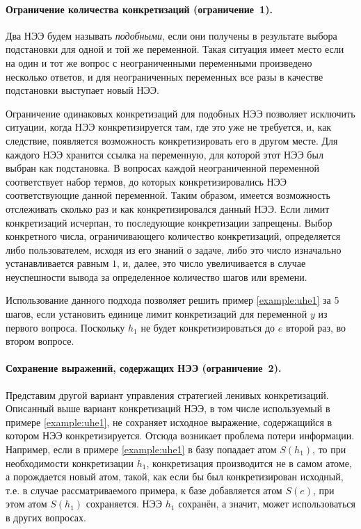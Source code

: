 \paragraph{Ограничение количества конкретизаций (ограничение~1).}
Два НЭЭ будем называть \emph{подобными}, если они получены в результате выбора подстановки для одной и той же переменной. Такая ситуация имеет место если на один и тот же вопрос с неограниченными переменными произведено несколько ответов, и для неограниченных переменных все разы в качестве подстановки выступает новый НЭЭ.

Ограничение одинаковых конкретизаций для подобных НЭЭ позволяет исключить ситуации, когда НЭЭ конкретизируется там, где это уже не требуется, и, как следствие, появляется возможность конкретизировать его в другом месте. Для каждого НЭЭ хранится ссылка на переменную, для которой этот НЭЭ был выбран как подстановка. В вопросах каждой неограниченной переменной соответствует набор термов, до которых конкретизировались НЭЭ соответствующие данной переменной. Таким образом, имеется возможность отслеживать сколько раз и как конкретизировался данный НЭЭ. Если лимит конкретизаций исчерпан, то последующие конкретизации запрещены. Выбор конкретного числа, ограничивающего количество конкретизаций, определяется либо пользователем, исходя из его знаний о задаче, либо это число изначально устанавливается равным $1$, и, далее, это число увеличивается в случае неуспешности вывода за определенное количество шагов или времени.

Использование данного подхода позволяет решить пример \ref{example:uhe1} за 5 шагов, если установить единице лимит конкретизаций для переменной $y$ из первого вопроса. Поскольку $h_1$ не будет конкретизироваться до $e$ второй раз, во втором вопросе.

\paragraph{Сохранение выражений, содержащих НЭЭ (ограничение~2).}
Представим другой вариант управления стратегией ленивых конкретизаций. Описанный выше вариант конкретизаций НЭЭ, в том числе используемый в примере \ref{example:uhe1}, не сохраняет исходное выражение, содержащийся в котором НЭЭ конкретизируется. Отсюда возникает проблема потери информации. Например, если в примере \ref{example:uhe1} в базу попадает атом $S(h_1)$, то при необходимости конкретизации $h_1$, конкретизация производится не в самом атоме, а порождается новый атом, такой, как если бы был конкретизирован исходный, т.е. в случае рассматриваемого примера, к базе добавляется атом $S(e)$, при этом атом $S(h_1)$ сохраняется. НЭЭ $h_1$ сохранён, а значит, может использоваться в других вопросах.

